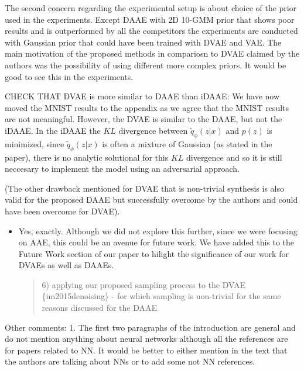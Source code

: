 \documentclass{article}
\begin{document}
{\color{blue}
The second concern regarding the experimental setup is about choice of the prior used in the experiments. Except DAAE with 2D 10-GMM prior that shows poor results and is outperformed by all the competitors the experiments are conducted with Gaussian prior that could have been trained with DVAE and VAE. The main motivation of the proposed methods in compariosn to DVAE claimed by the authors was the possibility of using different more complex priors. It would be good to see this in the experiments.}\newline 

{\color{red} CHECK THAT DVAE is more similar to DAAE than iDAAE: We have now moved the MNIST results to the appendix as we agree that the MNIST results are not meaningful. However, the DVAE is similar to the DAAE, but not the iDAAE. In the iDAAE the $KL$ divergence between $\tilde{q}_\phi(z|x)$ and $p(z)$ is minimized, since $\tilde{q}_\phi(z|x)$ is often a mixture of Gaussian (as stated in the paper), there is no analytic solutional for this $KL$ divergence and so it is still neccesary to implement the model using an adversarial approach.}


{\color{blue}(The other drawback mentioned for DVAE that is non-trivial synthesis is also valid for the proposed DAAE but successfully overcome by the authors and could have been overcome for DVAE)}. \newline

\begin{itemize}
    \item Yes, exactly. Although we did not explore this further, since we were focusing on AAE, this could be an avenue for future work. We have added this to the Future Work section of our paper to hilight the significance of our work for DVAEs as well as DAAEs.
    \begin{quote}
        6) applying our proposed sampling process to the DVAE \{im2015denoising\} - for which sampling is non-trivial for the same reasons discussed for the DAAE
    \end{quote}
\end{itemize}


Other comments: \newline
{\color{blue}
1. The first two paragraphs of the introduction are general and do not mention anything about neural networks although all the references are for papers related to NN. It would be better to either mention in the text that the authors are talking about NNs or to add some not NN references.}
\end{document}
